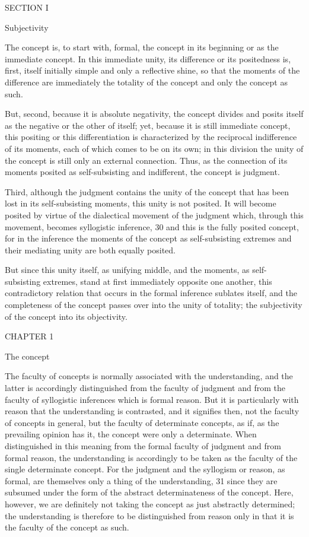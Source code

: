 SECTION I

Subjectivity

The concept is, to start with, formal,
the concept in its beginning
or as the immediate concept.
In this immediate unity, its difference
or its positedness is, first,
itself initially simple and only a reflective shine,
so that the moments of the difference are immediately
the totality of the concept and only the concept as such.

But, second, because it is absolute negativity, the concept divides and
posits itself as the negative or the other of itself; yet, because it is still
immediate concept, this positing or this differentiation is characterized by
the reciprocal indifference of its moments, each of which comes to be on
its own; in this division the unity of the concept is still only an external
connection. Thus, as the connection of its moments posited as self-subsisting
and indifferent, the concept is judgment.

Third, although the judgment contains the unity of the concept that
has been lost in its self-subsisting moments, this unity is not posited. It
will become posited by virtue of the dialectical movement of the judgment
which, through this movement, becomes syllogistic inference, 30 and this is
the fully posited concept, for in the inference the moments of the concept
as self-subsisting extremes and their mediating unity are both equally posited.

But since this unity itself, as unifying middle, and the moments, as self-
subsisting extremes, stand at first immediately opposite one another, this
contradictory relation that occurs in the formal inference sublates itself, and
the completeness of the concept passes over into the unity of totality; the
subjectivity of the concept into its objectivity.

CHAPTER 1

The concept

The faculty of concepts is normally associated with the understanding, and
the latter is accordingly distinguished from the faculty of judgment and
from the faculty of syllogistic inferences which is formal reason. But it is
particularly with reason that the understanding is contrasted, and it signifies
then, not the faculty of concepts in general, but the faculty of determinate
concepts, as if, as the prevailing opinion has it, the concept were only a
determinate. When distinguished in this meaning from the formal faculty
of judgment and from formal reason, the understanding is accordingly to
be taken as the faculty of the single determinate concept. For the judgment
and the syllogism or reason, as formal, are themselves only a thing of the
understanding, 31 since they are subsumed under the form of the abstract
determinateness of the concept. Here, however, we are definitely not taking
the concept as just abstractly determined; the understanding is therefore
to be distinguished from reason only in that it is the faculty of the concept
as such.

